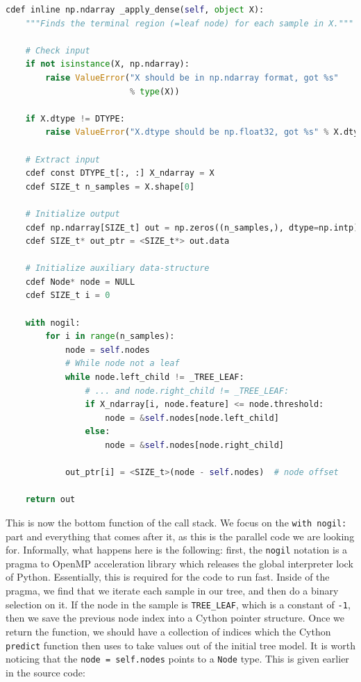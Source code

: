 \documentclass{IEEEtran}
\begin{document}
\begin{lstlisting}[language=Python]
cdef inline np.ndarray _apply_dense(self, object X):
    """Finds the terminal region (=leaf node) for each sample in X."""

    # Check input
    if not isinstance(X, np.ndarray):
        raise ValueError("X should be in np.ndarray format, got %s"
                         % type(X))

    if X.dtype != DTYPE:
        raise ValueError("X.dtype should be np.float32, got %s" % X.dtype)

    # Extract input
    cdef const DTYPE_t[:, :] X_ndarray = X
    cdef SIZE_t n_samples = X.shape[0]

    # Initialize output
    cdef np.ndarray[SIZE_t] out = np.zeros((n_samples,), dtype=np.intp)
    cdef SIZE_t* out_ptr = <SIZE_t*> out.data

    # Initialize auxiliary data-structure
    cdef Node* node = NULL
    cdef SIZE_t i = 0

    with nogil:
        for i in range(n_samples):
            node = self.nodes
            # While node not a leaf
            while node.left_child != _TREE_LEAF:
                # ... and node.right_child != _TREE_LEAF:
                if X_ndarray[i, node.feature] <= node.threshold:
                    node = &self.nodes[node.left_child]
                else:
                    node = &self.nodes[node.right_child]

            out_ptr[i] = <SIZE_t>(node - self.nodes)  # node offset

    return out
\end{lstlisting}

This is now the bottom function of the call stack. We focus on the \verb|with nogil:| part and everything that comes after it, as this is the parallel code we are looking for. Informally, what happens here is the following: first, the \verb|nogil| notation is a pragma to OpenMP acceleration library which releases the global interpreter lock of Python. Essentially, this is required for the code to run fast. Inside of the pragma, we find that we iterate each sample in our tree, and then do a binary selection on it. If the node in the sample is \verb|TREE_LEAF|, which is a constant of \verb|-1|, then we save the previous node index into a Cython pointer structure. Once we return the function, we should have a collection of indices which the Cython \verb|predict| function then uses to take values out of the initial tree model. It is worth noticing that the \verb|node = self.nodes| points to a \verb|Node| type. This is given earlier in the source code:
\end{document}
